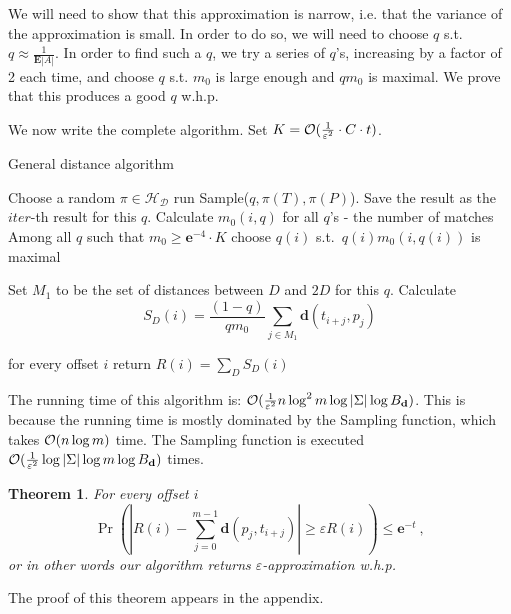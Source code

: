 \documentclass[11pt]{article}
\newcommand{\calO}{{\cal{O}}}
\newtheorem{thm}{Theorem}[section]
\newcommand{\be}{\begin{equation}}
\newcommand{\ee}{\end{equation}}
\newcommand{\envert}[1]{\left\lvert#1\right\rvert}
\let\abs=\envert
\newcommand{\bfE}{\textbf{E}}
\newcommand{\bfe}{\textbf{e}}
\newcommand{\dist}{\textbf{d}}
\begin{document}
We will need to show that this approximation is narrow, i.e. that
the variance of the approximation is small. In order to do so, we
will need to choose $q$ s.t. $q \approx \frac{1}{\bfE{\abs{A}}}$.
In order to find such a $q$, we try a series of $q$'s, increasing
by a factor of 2 each time, and choose $q$ s.t. $m_0$ is large
enough and $q m_0$ is maximal. We prove that this produces a good
$q$ w.h.p.

We now write the complete algorithm. Set $K=\calO(\frac{1}{\varepsilon^2}
\cdot C\cdot t )$.


\begin{algorithm}[H]
\caption{General distance algorithm} \label{alg:general_distance}
\begin{algorithmic}[1]
    \FOR {$D=B_{\dist}$ ;$D\geq 1$ ; $D=D/2$ }\label{FOR1}
       \label{FOR2}
         \label{FOR3}
            \STATE Choose a random $\pi \in  \mathcal{H_D}$
\STATE run Sample($q, \pi(T),\pi(P)$). Save the result as the $iter$-th result for this $q$.
        \ENDFOR
    \ENDFOR
            \STATE Calculate $m_0(i,q)$ for all $q$'s - the number
            of matches
            \STATE Among all $q$ such that $m_0\geq \bfe^{-4}\cdot K$ choose $q(i)$ s.t.\ $q(i) m_0(i,q(i))$ is maximal

\STATE Set $M_1$ to be the set of distances between $D$ and $2D$ for this $q$.
        \STATE Calculate
        $$S_D(i)=\frac{(1-q)}{q m_0}{\sum_{j\in M_1}\dist(t_{i+j},p_j)}$$


    \ENDFOR
  \ENDFOR
  \STATE for every offset $i$ return $R(i)=\sum_D S_D(i)$
\end{algorithmic}
\end{algorithm}

The running time of this algorithm is:
$\calO(\frac{1}{\varepsilon^2}n\log^2{m}\log{\abs{\Sigma}}\log{B_{\dist}})$.
This is because the running time is mostly dominated by the
Sampling function, which takes $\calO(n\log{m})$ time. The
Sampling function is executed
$\calO(\frac{1}{\varepsilon^2}\log{\abs{\Sigma}}
\log{m}\log{B_{\dist}})$ times.
\begin{thm}
For every offset $i$
\be
\Pr\left(\abs{R(i)-\sum_{j=0}^{m-1}\dist(p_j,t_{i+j})}\geq \varepsilon R(i)\right) \leq \bfe^{-t}\ ,
\ee
or in other words our algorithm returns $\varepsilon$-approximation w.h.p.
\end{thm}
The proof of this theorem appears in the appendix.
\end{document}
